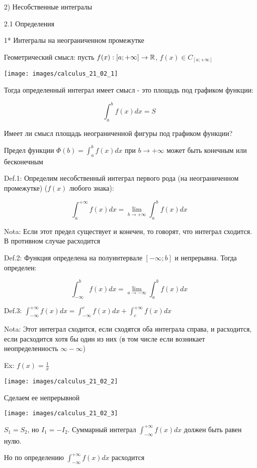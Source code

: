 \documentclass[12pt]{article}
\begin{document}
    2) Несобственные интегралы

    2.1 Определения

    1* Интегралы на неограниченном промежутке

    Геометрический смысл: пусть $f(x) : [a; +\infty] \to \mathbb{R}$, $f(x) \in C_{[a; +\infty]}$

    \texttt{[image: images/calculus\_21\_02\_1]}

    Тогда определенный интеграл имеет смысл - это площадь под графиком функции:

    \[\int^{b}_{a} f(x) dx = S\]

    Имеет ли смысл площадь неограниченной фигуры под графиком функции?

    Предел функции $\Phi (b) = \int^{b}_{a} f(x) dx$ при $b \to +\infty$ может быть конечным или бесконечным

    Def.1: Определим несобственный интеграл первого рода (на неограниченном промежутке) ($f(x)$ любого знака):

    \[\int^{+\infty}_{a} f(x) dx = \lim_{b \to +\infty} \int^{b}_{a} f(x) dx\]

    Nota: Если этот предел существует и конечен, то говорят, что интеграл сходится. В противном случае расходится

    Def.2: Функция определена на полуинтервале $[-\infty; b]$ и непрерывна. Тогда определен:

    \[\int^{b}_{-\infty} f(x) dx = \lim_{a \to -\infty} \int^{b}_{a} f(x) dx\]

    Def.3: $\displaystyle \int^{+\infty}_{-\infty} f(x) dx = \int^{c}_{-\infty} f(x) dx + \int^{+\infty}_{c} f(x) dx$

    Nota: Этот интеграл сходится, если сходятся оба интеграла справа, и расходится, если расходится хотя бы один из них
    (в том числе если возникает неопределенность $\infty - \infty$)

    Ex: $f(x) = \frac{1}{x}$

    \texttt{[image: images/calculus\_21\_02\_2]}

    Сделаем ее непрерывной

    \texttt{[image: images/calculus\_21\_02\_3]}

    $S_1 = S_2$, но $I_1 = -I_2$. Суммарный интеграл $\displaystyle \int^{+\infty}_{-\infty} f(x) dx$ должен быть равен нулю.

    Но по определению $\displaystyle \int^{+\infty}_{-\infty} f(x) dx$ расходится
\end{document}
